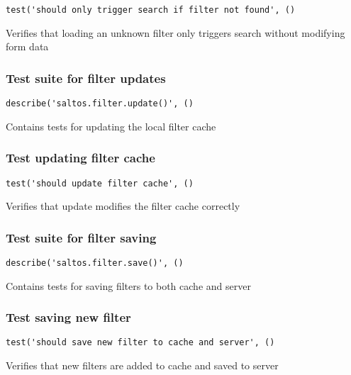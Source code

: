 \documentclass[a4paper]{article}
\begin{document}
\begin{lstlisting}
test('should only trigger search if filter not found', ()
\end{lstlisting}

Verifies that loading an unknown filter only triggers search
without modifying form data

\hypertarget{toc157}{}
\subsubsection{Test suite for filter updates}

\begin{lstlisting}
describe('saltos.filter.update()', ()
\end{lstlisting}

Contains tests for updating the local filter cache

\hypertarget{toc158}{}
\subsubsection{Test updating filter cache}

\begin{lstlisting}
test('should update filter cache', ()
\end{lstlisting}

Verifies that update modifies the filter cache correctly

\hypertarget{toc159}{}
\subsubsection{Test suite for filter saving}

\begin{lstlisting}
describe('saltos.filter.save()', ()
\end{lstlisting}

Contains tests for saving filters to both cache and server

\hypertarget{toc160}{}
\subsubsection{Test saving new filter}

\begin{lstlisting}
test('should save new filter to cache and server', ()
\end{lstlisting}

Verifies that new filters are added to cache and saved to server
\end{document}
